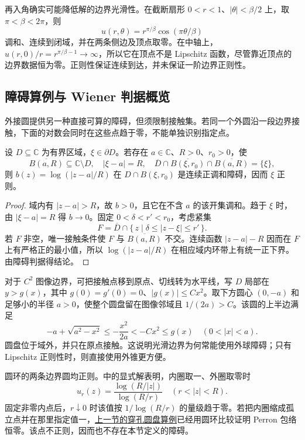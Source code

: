 \ProseParagraphBreak

再入角确实可能降低解的边界光滑性。在截断扇形 \(0<r<1\)、\(|\theta|<\beta/2\) 上，取 \(\pi<\beta<2\pi\)，则
\[
 u(r,\theta)=r^{\pi/\beta}\cos(\pi\theta/\beta)
\]
调和、连续到闭域，并在两条侧边及顶点取零。在中轴上，\(u(r,0)/r=r^{\pi/\beta-1}\to\infty\)，所以它在顶点不是 Lipschitz 函数，尽管靠近顶点的边界数据恒为零。正则性保证连续到达，并未保证一阶边界正则性。

\subsection{障碍算例与 Wiener 判据概览}
\label{b3:subsec:160304}

外接圆提供另一种直接可算的障碍，但须限制接触集。若同一个外圆沿一段边界接触，下面的对数会同时在这些点趋于零，不能单独识别指定点。

\begin{proposition}[唯一接触的外球障碍]\label{b3:prop:16-exterior-ball-barrier}
设 \(D\subseteq\mathbb C\) 为有界区域，\(\xi\in\partial D\)。若存在 \(a\in\mathbb C\)、\(R>0\)、\(r_0>0\)，使
\[
 \overline{B(a,R)}\subseteq\mathbb C\setminus D,
 \quad |\xi-a|=R,
 \quad
 \overline D\cap\overline{B(\xi,r_0)}\cap\overline{B(a,R)}=\{\xi\},
\]
则 \(b(z)=\log(|z-a|/R)\) 在 \(D\cap B(\xi,r_0)\) 是连续正调和障碍，因而 \(\xi\) 正则。
\end{proposition}
\begin{proof}
域内有 \(|z-a|>R\)，故 \(b>0\)，且它在不含 \(a\) 的该开集调和。趋于 \(\xi\) 时，由 \(|\xi-a|=R\) 得 \(b\to0\)。固定 \(0<\delta<r'<r_0\)，考虑紧集
\[
 F=\overline D\cap\{\,z\mid\delta\le|z-\xi|\le r'\,\}.
\]
若 \(F\) 非空，唯一接触条件使 \(F\) 与 \(\overline{B(a,R)}\) 不交。连续函数 \(|z-a|-R\) 因而在 \(F\) 上有严格正的最小值，所以 \(\log(|z-a|/R)\) 在相应域内环带上有统一正下界。由障碍判据得结论。
\end{proof}
对于 \(C^2\) 图像边界，可把接触点移到原点、切线转为水平线，写 \(D\) 局部在 \(y>g(x)\)，其中 \(g(0)=g'(0)=0\)、\(|g(x)|\le Cx^2\)。取下方圆心 \((0,-a)\) 和足够小的半径 \(a>0\)，使整个圆盘留在图像邻域且 \(1/(2a)>C\)。该圆的上半边满足
\[
 -a+\sqrt{a^2-x^2}\le-\frac{x^2}{2a}<-Cx^2\le g(x)
 \quad(0<|x|<a).
\]
圆盘位于域外，并只在原点接触。这说明光滑边界为何常能使用外球障碍；只有 Lipschitz 正则性时，则直接使用外锥更方便。

\ProseParagraphBreak

圆环的两条边界圆均正则。中的显式解表明，内圈取一、外圈取零时
\[
 u_r(z)=\frac{\log(R/|z|)}{\log(R/r)}
 \quad(r<|z|<R).
\]
固定非零内点后，\(r\downarrow0\) 时该值按 \(1/\log(R/r)\) 的量级趋于零。若把内圈缩成孤立点并在那里指定值一，\hyperref[b3:exmp:16-punctured-disk]{上一节的穿孔圆盘算例}已经用圆环比较证明 Perron 包络恒零。该点不正则，因而也不存在本节定义的障碍。

